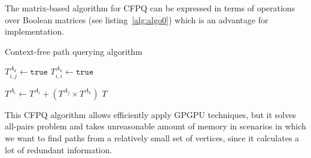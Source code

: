The matrix-based algorithm for CFPQ can be expressed in terms of operations over Boolean matrices (see listing~\ref{alg:algo0}) which is an advantage for implementation.
{\footnotesize
\begin{algorithm}
\begin{algorithmic}[1]
\caption{Context-free path querying algorithm}
\label{alg:algo0}
          {$T^{A_k}_{i,j} \gets \texttt{true}$}
    \EndFor
            {$T^{A_k}_{i,i} \gets \texttt{true}$}
        \EndFor
    \EndFor

          { $T^{A_i} \gets T^{A_i} + (T^{A_j} \times T^{A_k})$ } 
        \EndFor
    \EndWhile
\State \Return $T$
\EndFunction
\end{algorithmic}
\end{algorithm}
}

This CFPQ algorithm allows efficiently apply GPGPU techniques, but it solves all-pairs problem and takes unreasonable amount of memory in scenarios in which we want to find paths from a relatively small set of vertices, since it calculates a lot of redundant information. 